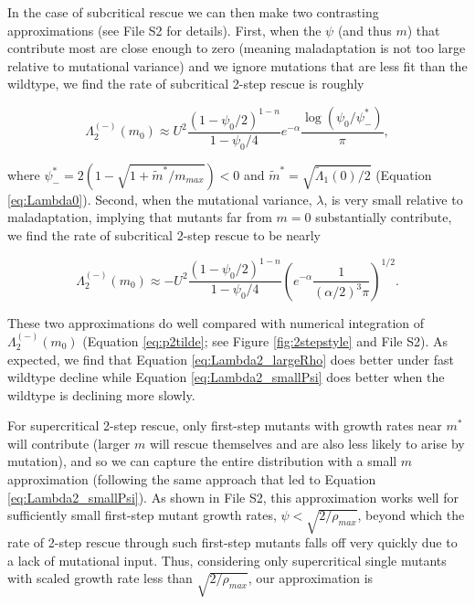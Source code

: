\documentclass[9pt,twocolumn,twoside,lineno]{gsajnl}
\begin{document}
In the case of subcritical rescue we can then make two contrasting approximations (see File S2 for details).
First, when the $\psi$ (and thus $m$) that contribute most are close enough to zero (meaning maladaptation is not too large relative to mutational variance) and we ignore mutations that are less fit than the wildtype, we find the rate of subcritical 2-step rescue is roughly

\begin{equation}\label{eq:Lambda2_smallPsi}
\Lambda_2^{(-)}(m_0) \approx U^2 \frac{(1-\psi_0/2)^{1-n}}{1-\psi_0/4} e^{-\alpha} \frac{\log(\psi_0 / \psi^*_{-})}{\pi},
\end{equation}

\noindent where $\psi^*_{-} = 2(1-\sqrt{1 + \tilde{m}^*/m_{max}})<0$ and $\tilde{m}^* = \sqrt{\tilde{\Lambda}_1(0)/2}$ (Equation \ref{eq:Lambda0}).
Second, when the mutational variance, $\lambda$, is very small relative to maladaptation, implying that mutants far from $m=0$ substantially contribute, we find the rate of subcritical 2-step rescue to be nearly

\begin{equation}\label{eq:Lambda2_largeRho}
\Lambda_2^{(-)}(m_0) \approx -U^2 \frac{(1-\psi_0/2)^{1-n}}{1-\psi_0/4} \left(  e^{-\alpha} \frac{1}{(\alpha/2)^3 \pi} \right)^{1/2}.
\end{equation}

\noindent These two approximations do well compared with numerical integration of $\Lambda_2^{(-)}(m_0)$ (Equation \ref{eq:p2tilde}; see Figure \ref{fig:2stepstyle} and File S2).
As expected, we find that Equation \ref{eq:Lambda2_largeRho} does better under fast wildtype decline while Equation \ref{eq:Lambda2_smallPsi} does better when the wildtype is declining more slowly. 

For supercritical 2-step rescue, only first-step mutants with growth rates near $m^*$ will contribute (larger $m$ will rescue themselves and are also less likely to arise by mutation), and so we can capture the entire distribution with a small $m$ approximation (following the same approach that led to Equation \ref{eq:Lambda2_smallPsi}).
As shown in File S2, this approximation works well for sufficiently small first-step mutant growth rates, $\psi<\sqrt{2/\rho_{max}}$, beyond which the rate of 2-step rescue through such first-step mutants falls off very quickly due to a lack of mutational input.
Thus, considering only supercritical single mutants with scaled growth rate less than $\sqrt{2/\rho_{max}}$, our approximation is
\end{document}
